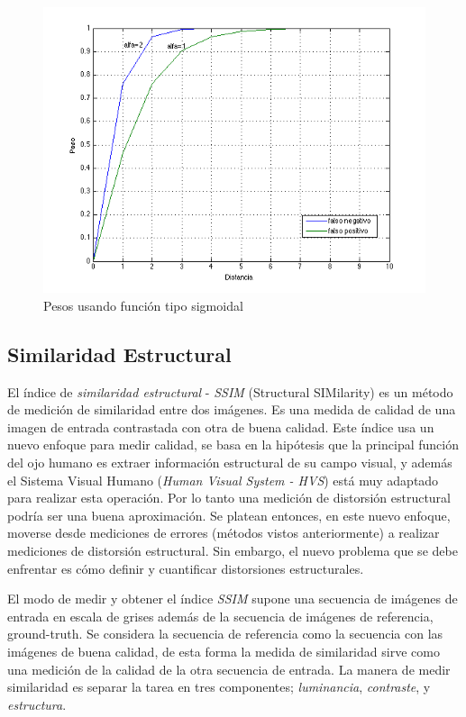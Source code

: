 \begin{figure}[!ht]
\centering
\includegraphics[scale=0.4]{img/sigmoid_function}
\caption{Pesos usando función tipo sigmoidal}
\label{fig:Pesos tipo sigmoidal}
\end{figure}


\subsection{Similaridad Estructural}
El índice de \emph{similaridad estructural} - \emph{SSIM} (Structural SIMilarity) \cite{park_benchmark_2013} \cite{wang_image_2004} es un método de medición de similaridad entre dos imágenes. Es una medida de calidad de una imagen de entrada contrastada con otra de buena calidad. Este índice usa un nuevo enfoque para medir calidad, se basa en la hipótesis que la principal función del ojo humano  es extraer información estructural de su campo visual, y además el Sistema Visual Humano (\emph{Human Visual System - HVS}) está muy adaptado para realizar esta operación. Por lo tanto una medición de distorsión estructural podría ser una buena aproximación. Se platean entonces, en este nuevo enfoque, moverse desde mediciones de errores (métodos vistos anteriormente) a realizar mediciones de distorsión estructural. Sin embargo, el nuevo problema que se debe enfrentar es cómo definir y cuantificar distorsiones estructurales.

El modo de medir y obtener el índice \emph{SSIM} supone una secuencia de imágenes de entrada en escala de grises además de la secuencia de imágenes de referencia, ground-truth. Se considera la secuencia de referencia como la secuencia con las imágenes de buena calidad, de esta forma la medida de similaridad sirve como una medición de la calidad de la otra secuencia de entrada. La manera de medir similaridad es separar la tarea en tres componentes; \emph{luminancia}, \emph{contraste}, y \emph{estructura}.

